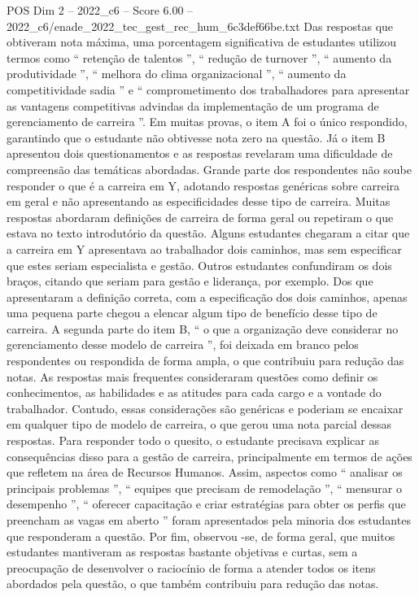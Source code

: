 \begin{textsample}{POS Dim 2 – 2022\_c6 – Score 6.00 – 2022\_c6/enade\_2022\_tec\_gest\_rec\_hum\_6c3def66be.txt}
Das respostas que obtiveram nota máxima, uma porcentagem significativa de estudantes utilizou termos como “ retenção de talentos ”, “ redução de turnover ”, “ aumento da produtividade ”, “ melhora do clima organizacional ”, “ aumento da competitividade sadia ” e “ comprometimento dos trabalhadores para apresentar as vantagens competitivas advindas da implementação de um programa de gerenciamento de carreira ”.
Em muitas provas, o item A foi o único respondido, garantindo que o estudante não obtivesse nota zero na questão.
Já o item B apresentou dois questionamentos e as respostas revelaram uma dificuldade de compreensão das temáticas abordadas.
Grande parte dos respondentes não soube responder o que é a carreira em Y, adotando respostas genéricas sobre carreira em geral e não apresentando as especificidades desse tipo de carreira.
Muitas respostas abordaram definições de carreira de forma geral ou repetiram o que estava no texto introdutório da questão.
Alguns estudantes chegaram a citar que a carreira em Y apresentava ao trabalhador dois caminhos, mas sem especificar que estes seriam especialista e gestão.
Outros estudantes confundiram os dois braços, citando que seriam para gestão e liderança, por exemplo.
Dos que apresentaram a definição correta, com a especificação dos dois caminhos, apenas uma pequena parte chegou a elencar algum tipo de benefício desse tipo de carreira.
A segunda parte do item B, “ o que a organização deve considerar no gerenciamento desse modelo de carreira ”, foi deixada em branco pelos respondentes ou respondida de forma ampla, o que contribuiu para redução das notas.
As respostas mais frequentes consideraram questões como definir os conhecimentos, as habilidades e as atitudes para cada cargo e a vontade do trabalhador.
Contudo, essas considerações são genéricas e poderiam se encaixar em qualquer tipo de modelo de carreira, o que gerou uma nota parcial dessas respostas.
Para responder todo o quesito, o estudante precisava explicar as consequências disso para a gestão de carreira, principalmente em termos de ações que refletem na área de Recursos Humanos.
Assim, aspectos como “ analisar os principais problemas ”, “ equipes que precisam de remodelação ”, “ mensurar o desempenho ”, “ oferecer capacitação e criar estratégias para obter os perfis que preencham as vagas em aberto ” foram apresentados pela minoria dos estudantes que responderam a questão.
Por fim, observou -se, de forma geral, que muitos estudantes mantiveram as respostas bastante objetivas e curtas, sem a preocupação de desenvolver o raciocínio de forma a atender todos os itens abordados pela questão, o que também contribuiu para redução das notas.

\end{textsample}
